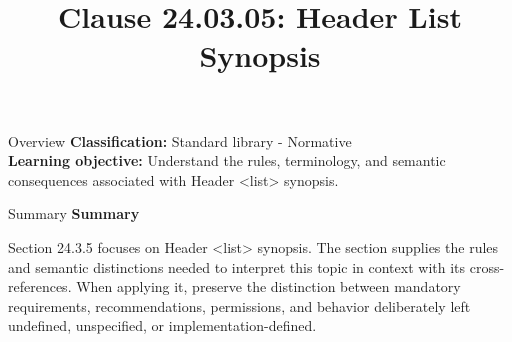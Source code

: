 \documentclass[10pt,letterpaper]{article}
\title{Clause 24.03.05: Header List Synopsis}
\author{}
\date{}
\begin{document}
\maketitle
\begin{CornellOverviewBox}{Overview}
\textbf{Classification:} Standard library - Normative\\[2pt]
\textbf{Learning objective:} Understand the rules, terminology, and semantic consequences associated with Header <list> synopsis.
\end{CornellOverviewBox}\begin{CornellSummaryBox}{Summary}
{\sffamily\bfseries\color{Accent} Summary}\par\vspace{3pt}Section 24.3.5 focuses on Header <list> synopsis. The section supplies the rules and semantic distinctions needed to interpret this topic in context with its cross-references. When applying it, preserve the distinction between mandatory requirements, recommendations, permissions, and behavior deliberately left undefined, unspecified, or implementation-defined.
\end{CornellSummaryBox}
\end{document}
